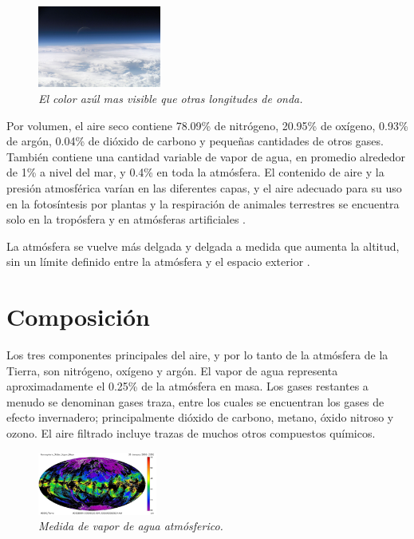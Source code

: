 \documentclass[12pt]{article}
\begin{document}
\begin{figure} 
    \includegraphics[width=0.36\textwidth]{Atmosfera.jpg}
    \caption{\textit{El color azúl mas visible que otras longitudes de onda.}}
\end{figure}

Por volumen, el aire seco contiene 78.09\% de nitrógeno, 20.95\% de oxígeno, 0.93\% de argón, 0.04\% de dióxido de carbono y pequeñas cantidades de otros gases. También contiene una cantidad variable de vapor de agua, en promedio alrededor de 1\% a nivel del mar, y 0.4\% en toda la atmósfera. El contenido de aire y la presión atmosférica varían en las diferentes capas, y el aire adecuado para su uso en la fotosíntesis por plantas y la respiración de animales terrestres se encuentra solo en la tropósfera y en atmósferas artificiales .

La atmósfera se vuelve más delgada y delgada a medida que aumenta la altitud, sin un límite definido entre la atmósfera y el espacio exterior .
\section{Composición}
	Los tres componentes principales del aire, y por lo tanto de la atmósfera de la Tierra, son nitrógeno, oxígeno y argón. El vapor de agua representa aproximadamente el 0.25\% de la atmósfera en masa. Los gases restantes a menudo se denominan gases traza, entre los cuales se encuentran los gases de efecto invernadero; principalmente dióxido de carbono, metano, óxido nitroso y ozono. El aire filtrado incluye trazas de muchos otros compuestos químicos.
    
\begin{figure} 
\includegraphics[width=0.35\textwidth]{Vapor.jpg}
\caption{\textit{Medida de vapor de agua atmósferico.}}
\end{figure}
    
\end{document}
